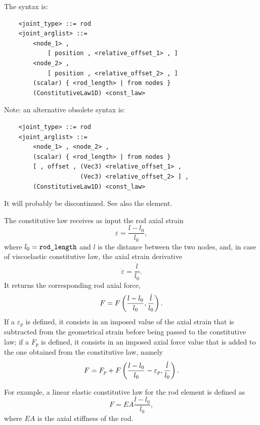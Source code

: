 The syntax is:
\begin{verbatim}
    <joint_type> ::= rod 
    <joint_arglist> ::=
        <node_1> ,
            [ position , <relative_offset_1> , ]
        <node_2> , 
            [ position , <relative_offset_2> , ]
        (scalar) { <rod_length> | from nodes }
        (ConstitutiveLaw1D) <const_law>
\end{verbatim}
Note: an alternative obsolete syntax is:
\begin{verbatim}
    <joint_type> ::= rod 
    <joint_arglist> ::=
        <node_1> , <node_2> , 
        (scalar) { <rod_length> | from nodes }
        [ , offset , (Vec3) <relative_offset_1> , 
                     (Vec3) <relative_offset_2> ] ,
        (ConstitutiveLaw1D) <const_law>
\end{verbatim}
It will probably be discontinued.
See also
the 
element.

The constitutive law  receives as input the rod axial strain
\begin{equation}
	\varepsilon = \frac{l - l_0}{l_0} ,
\end{equation}
where $l_0=\texttt{rod\_length}$ and $l$ is the distance between the two nodes,
and, in case of viscoelastic constitutive law, the axial strain derivative
\begin{equation}
	\dot{\varepsilon} = \frac{\dot{l}}{l_0} .
\end{equation}
It returns the corresponding rod axial force,
\begin{displaymath}
	F = F\left( \frac{l - l_0}{l_0}, \frac{\dot{l}}{l_0} \right) .
\end{displaymath}
If a  $\varepsilon_p$ is defined,
it consists in an imposed value of the axial strain
that is subtracted from the geometrical strain
before being passed to the constitutive law;
if a  $F_p$ is defined,
it consists in an imposed axial force value
that is added to the one obtained from the constitutive law,
namely
\begin{displaymath}
	F = F_p + F\left( \frac{l - l_0}{l_0} - \varepsilon_p, \frac{\dot{l}}{l_0} \right) .
\end{displaymath}

For example, a linear elastic constitutive law for the rod element
is defined as
\begin{displaymath}
	F = EA \frac{l - l_0}{l_0} ,
\end{displaymath}
where $EA$ is the axial stiffness of the rod.

